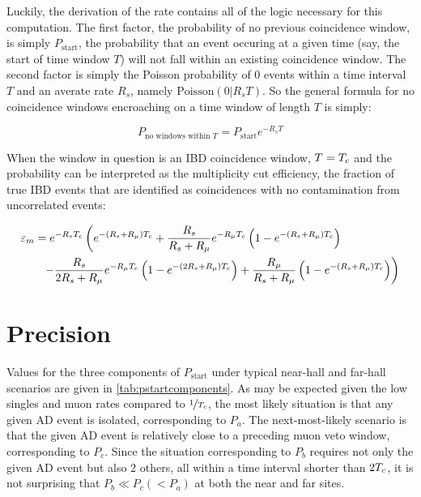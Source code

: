 Luckily, the derivation of the  rate contains all of the logic
necessary for this computation.
The first factor, the probability of no previous coincidence window,
is simply $P_{\text{start}}$, the probability that an event
occuring at a given time (say, the start of time window $T$)
will not fall within an existing coincidence window.
The second factor is simply the Poisson probability
of \num{0} events within a time interval $T$
and an averate rate $R_s$,
namely $\text{Poisson}(0\vert R_s T)$.
So the general formula for no coincidence windows encroaching
on a time window of length $T$ is simply:

\begin{equation}
    P_{\text{no windows within }T} = P_{\text{start}} e^{-R_s T}
\end{equation}

When the window in question is an IBD coincidence window,
$T = T_c$ and the probability can be interpreted as the multiplicity cut efficiency,
the fraction of true IBD events that are identified as  coincidences
with no contamination from uncorrelated events:

\begin{align}
    \label{eq:mult_eff_ap}
    \begin{split}
        \varepsilon_m &= e^{-R_s T_c}
        \left(
            e^{-(R_s + R_\mu)T_c} +
            \frac{R_s}{R_s+R_\mu} e^{-R_\mu T_c}
            \left(
                1 - e^{-(R_s + R_\mu)T_c}
            \right)
        \right. \\
              &\ \ \left. - \frac{R_s}{2R_s + R_\mu} e^{-R_\mu T_c}
                  \left(
                      1 - e^{-(2R_s + R_\mu)T_c}
                  \right) +
                  \frac{R_\mu}{R_s + R_\mu}
                  \left(
                      1 - e^{-(R_s + R_\mu)T_c}
                  \right)
              \right)
    \end{split}
\end{align}

\section{Precision}
\label{ap:singlesprecision}

Values for the three components of $P_{\text{start}}$
under typical near-hall and far-hall scenarios
are given in \cref{tab:pstartcomponents}.
As may be expected given the low singles and muon
rates compared to $\nicefrac{1}{T_c}$,
the most likely situation is that any given AD event
is isolated, corresponding to $P_a$.
The next-most-likely scenario is that the given AD event
is relatively close to a preceding muon veto window,
corresponding to $P_c$.
Since the situation corresponding to $P_b$ requires
not only the given AD event but also 2 others,
all within a time interval shorter than $2T_c$,
it is not surprising that $P_b\ll P_c (< P_a)$
at both the near and far sites.

